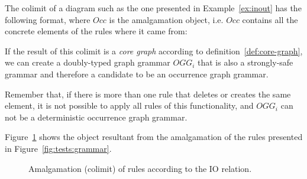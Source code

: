 The colimit of a diagram such as the one presented in Example~\ref{ex:inout} has the following format, where $Occ$ is the amalgamation object, i.e. $Occ$ contains all the concrete elements of the rules where it came from:

\hfill\break

If the result of this colimit is a \emph{core graph} according to definition~\ref{def:core-graph}, we can create a doubly-typed graph grammar $OGG_i$ that is also a strongly-safe grammar and therefore a candidate to be an occurrence graph grammar.

Remember that, if there is more than one rule that deletes or creates the same element, it is not possible to apply all rules of this functionality, and $OGG_i$ can not be a deterministic occurrence graph grammar. 

\begin{example}\label{ex:amalgamation} Figure~\ref{fig:tests:colimit} shows the object resultant from the amalgamation of the rules presented in Figure~\ref{fig:tests:grammar}.

\begin{figure}[!ht]
  \centering
  \caption{Amalgamation (colimit) of rules according to the IO relation.}\label{fig:tests:colimit}
\end{figure}

\end{example}

